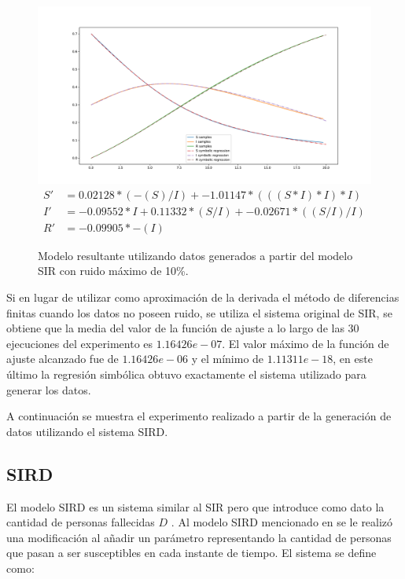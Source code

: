 \begin{figure}[h]
    \centering
    \includegraphics[width=\textwidth]{"figures/final_plot_SIR_0.1.pdf"}
    \begin{align*}
        S' & =  0.02128 * (-(S) / I) + -1.01147 * (((S * I) * I) * I)      \\
        I' & = -0.09552 * I + 0.11332 * (S / I) + -0.02671 * ((S / I) / I) \\
        R' & = -0.09905 * -(I)
    \end{align*}
    \caption{Modelo resultante utilizando datos generados a partir del modelo SIR con ruido máximo de 10\%.}
    \label{fig:final_plot_SIR_0.1}
\end{figure}

Si en lugar de utilizar como aproximación de la derivada el método de diferencias finitas cuando los datos no poseen ruido, se utiliza el sistema original de SIR, se obtiene que la media del valor de la función de ajuste a lo largo de las 30 ejecuciones del experimento es $1.16426e-07$. El valor máximo de la función de ajuste alcanzado fue de $1.16426e-06$ y el mínimo de $1.11311e-18$, en este último la regresión simbólica obtuvo exactamente el sistema utilizado para generar los datos.

A continuación se muestra el experimento realizado a partir de la generación de datos utilizando el sistema SIRD.

\subsection{SIRD}

El modelo SIRD es un sistema similar al SIR pero que introduce como dato la cantidad de personas fallecidas $D$ \cite{bailey1975mathematical}. Al modelo SIRD mencionado en \cite{bailey1975mathematical} se le realizó una modificación al añadir un parámetro representando la cantidad de personas que pasan a ser susceptibles en cada instante de tiempo. El sistema se define como:

